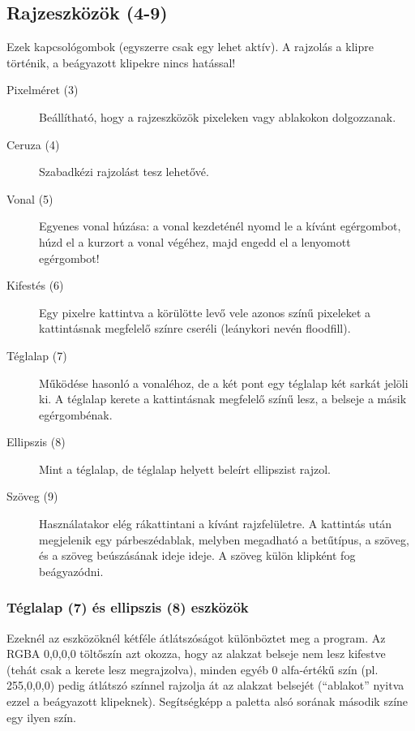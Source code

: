 \documentclass[a4paper,12pt,release]{article}
\begin{document}
\subsection{Rajzeszközök (4-9)} Ezek kapcsológombok (egyszerre csak egy lehet aktív). A rajzolás a klipre történik, a beágyazott klipekre nincs hatással!
\begin{description}
\item[Pixelméret (3)]Beállítható, hogy a rajzeszközök pixeleken vagy ablakokon dolgozzanak.
\item[Ceruza (4)]Szabadkézi rajzolást tesz lehetővé.
\item[Vonal (5)]Egyenes vonal húzása: a vonal kezdeténél nyomd le a kívánt egérgombot, húzd el a kurzort a vonal végéhez, majd engedd el a lenyomott egérgombot!
\item[Kifestés (6)]Egy pixelre kattintva a körülötte levő vele azonos színű pixeleket a kattintásnak megfelelő színre cseréli (leánykori nevén floodfill).
\item[Téglalap (7)]Működése hasonló a vonaléhoz, de a két pont egy téglalap két sarkát jelöli ki. A téglalap kerete a kattintásnak megfelelő színű lesz, a belseje a másik egérgombénak.
\item[Ellipszis (8)]Mint a téglalap, de téglalap helyett beleírt ellipszist rajzol.
\item[Szöveg (9)]Használatakor elég rákattintani a kívánt rajzfelületre. A kattintás után megjelenik egy párbeszédablak, melyben megadható a betűtípus, a szöveg, és a szöveg beúszásának ideje ideje. A szöveg külön klipként fog beágyazódni.
\end{description}
\subsubsection{Téglalap (7) és ellipszis (8) eszközök}
Ezeknél az eszközöknél kétféle átlátszóságot különböztet meg a program. Az RGBA 0,0,0,0 töltőszín azt okozza, hogy az alakzat belseje nem lesz kifestve (tehát csak a kerete lesz megrajzolva), minden egyéb 0 alfa-értékű szín (pl. 255,0,0,0) pedig átlátszó színnel rajzolja át az alakzat belsejét (``ablakot'' nyitva ezzel a beágyazott klipeknek). Segítségképp a paletta alsó sorának második színe egy ilyen szín.
\end{document}
